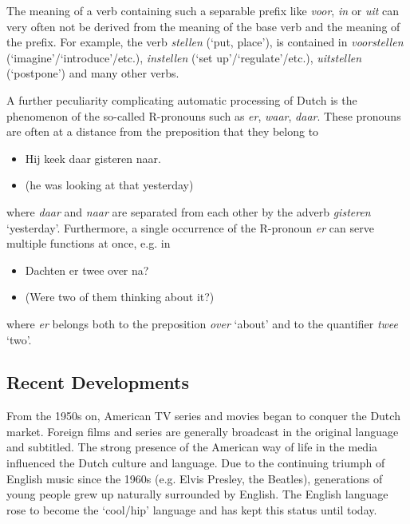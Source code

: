 \documentclass[]{../../metanetpaper}
\begin{document}
\begin{multicols}{2}
    The meaning of a verb containing such a separable prefix like \textit{voor}, \textit{in} or \textit{uit} can very often not be derived from the meaning of the base verb and the meaning of the prefix. For example, the verb \textit{stellen} (`put, place'), is contained in \textit{voorstellen} (`imagine'/`introduce'/etc.), \textit{instellen} (`set up'/`regulate'/etc.), \textit{uitstellen} (`postpone') and many other verbs.


    A further peculiarity complicating automatic processing of Dutch is the phenomenon of the so-called R-pronouns such as \textit{er}, \textit{waar}, \textit{daar}. These pronouns are often at a distance from the preposition that they belong to

\begin{itemize}
\item Hij keek daar gisteren naar.
    \item (he was looking at that yesterday)
\end{itemize}

    where \textit{daar} and \textit{naar} are separated from each other by the adverb \textit{gisteren} `yesterday'.
    Furthermore, a single occurrence of the R-pronoun \textit{er} can serve multiple functions at once, e.g. in\\

\begin{itemize}
\item Dachten er twee over na?
\item (Were two of them thinking about it?)
\end{itemize}



    where \textit{er} belongs both to the preposition \textit{over} `about' and to the quantifier \textit{twee} `two'.

\subsection{Recent Developments}

From the 1950s on, American TV series and movies began to conquer the Dutch market. Foreign films and series are generally broadcast in the original language and subtitled. The strong presence of the American way of life in the media influenced the Dutch culture and language.  Due to the continuing triumph of English music since the 1960s (e.g. Elvis Presley, the Beatles), generations of young people grew up naturally surrounded by English. The English language rose to become the `cool/hip' language and has kept this status until today.


\end{multicols}
\end{document}
